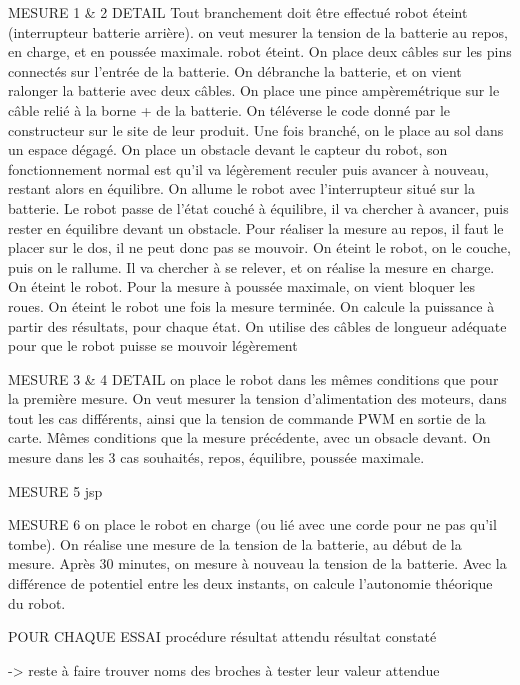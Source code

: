 MESURE 1 & 2 DETAIL
Tout branchement doit être effectué robot éteint (interrupteur batterie arrière).
on veut mesurer la tension de la batterie au repos, en charge, et en poussée maximale.
robot éteint. On place deux câbles sur les pins connectés sur l'entrée de la batterie.
On débranche la batterie, et on vient ralonger la batterie avec deux câbles.
On place une pince ampèremétrique sur le câble relié à la borne + de la batterie.
On téléverse le code donné par le constructeur sur le site de leur produit.
Une fois branché, on le place au sol dans un espace dégagé.
On place un obstacle devant le capteur du robot, son fonctionnement normal est qu'il
va légèrement reculer puis avancer à nouveau, restant alors en équilibre.
On allume le robot avec l'interrupteur situé sur la batterie.
Le robot passe de l'état couché à équilibre, il va chercher à avancer, puis rester 
en équilibre devant un obstacle.
Pour réaliser la mesure au repos, il faut le placer sur le dos, il ne peut donc
pas se mouvoir.
On éteint le robot, on le couche, puis on le rallume. Il va chercher à se relever,
et on réalise la mesure en charge. On éteint le robot.
Pour la mesure à poussée maximale, on vient bloquer les roues.
On éteint le robot une fois la mesure terminée.
On calcule la puissance à partir des résultats, pour chaque état.
On utilise des câbles de longueur adéquate pour que le robot puisse se mouvoir légèrement

MESURE 3 & 4 DETAIL
on place le robot dans les mêmes conditions que pour la première mesure.
On veut mesurer la tension d'alimentation des moteurs, dans tout les cas différents,
ainsi que la tension de commande PWM en sortie de la carte.
Mêmes conditions que la mesure précédente, avec un obsacle devant.
On mesure dans les 3 cas souhaités, repos, équilibre, poussée maximale.

MESURE 5 jsp

MESURE 6 on place le robot en charge (ou lié avec une corde pour ne pas qu'il tombe).
On réalise une mesure de la tension de la batterie, au début de la mesure.
Après 30 minutes, on mesure à nouveau la tension de la batterie.
Avec la différence de potentiel entre les deux instants, on calcule l'autonomie
théorique du robot.

POUR CHAQUE ESSAI
procédure
résultat attendu
résultat constaté

-> reste à faire
trouver noms des broches à tester
leur valeur attendue
